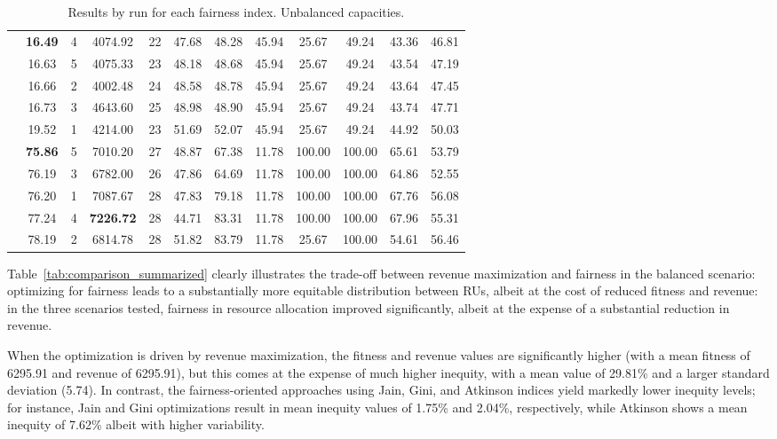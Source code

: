 \documentclass[preprint,12pt]{elsarticle}
\begin{document}
\begin{table}[htbp]
\begin{adjustbox}{max width=\textwidth}
\begin{tabular}{|c|c|c|c|c|c|c|c|c|c|c|c|}
\parbox[t]{2mm}{} & \textbf{16.49} & 4 & 4074.92 & 22 & 47.68 & 48.28 & 45.94 & 25.67 & 49.24 & 43.36 & 46.81 \\
& 16.63 & 5 & 4075.33 & 23 & 48.18 & 48.68 & 45.94 & 25.67 & 49.24 & 43.54 & 47.19 \\ 
& 16.66 & 2 & 4002.48 & 24 & 48.58 & 48.78 & 45.94 & 25.67 & 49.24 & 43.64 & 47.45 \\ 
& 16.73 & 3 & 4643.60 & 25 & 48.98 & 48.90 & 45.94 & 25.67 & 49.24 & 43.74 & 47.71 \\ 
& 19.52 & 1 & 4214.00 & 23 & 51.69 & 52.07 & 45.94 & 25.67 & 49.24 & 44.92 & 50.03 \\ \hline

\parbox[t]{2mm}{} & \textbf{75.86} & 5 & 7010.20 & 27 & 48.87 & 67.38 & 11.78 & 100.00 & 100.00 & 65.61 & 53.79 \\
& 76.19 & 3 & 6782.00 & 26 & 47.86 & 64.69 & 11.78 & 100.00 & 100.00 & 64.86 & 52.55 \\
& 76.20 & 1 & 7087.67 & 28 & 47.83 & 79.18 & 11.78 & 100.00 & 100.00 & 67.76 & 56.08 \\ 
& 77.24 & 4 & \textbf{7226.72} & 28 & 44.71 & 83.31 & 11.78 & 100.00 & 100.00 & 67.96 & 55.31 \\ 
& 78.19 & 2 & 6814.78 & 28 & 51.82 & 83.79 & 11.78 & 25.67 & 100.00 & 54.61 & 56.46 \\ \hline

\end{tabular}
\end{adjustbox}
\caption{Results by run for each fairness index. Unbalanced capacities.}
\label{tab:unbalanced_capacities}
\end{table}

Table~\ref{tab:comparison_summarized} clearly illustrates the trade-off between revenue maximization and fairness in the balanced scenario: optimizing for fairness leads to a substantially more equitable distribution between RUs, albeit at the cost of reduced fitness and revenue: in the three scenarios tested, fairness in resource allocation improved significantly, albeit at the expense of a substantial reduction in revenue.

When the optimization is driven by revenue maximization, the fitness and revenue values are significantly higher (with a mean fitness of 6295.91 and revenue of 6295.91), but this comes at the expense of much higher inequity, with a mean value of 29.81\% and a larger standard deviation (5.74). In contrast, the fairness-oriented approaches using Jain, Gini, and Atkinson indices yield markedly lower inequity levels; for instance, Jain and Gini optimizations result in mean inequity values of 1.75\% and 2.04\%, respectively, while Atkinson shows a mean inequity of 7.62\% albeit with higher variability.
\end{document}
